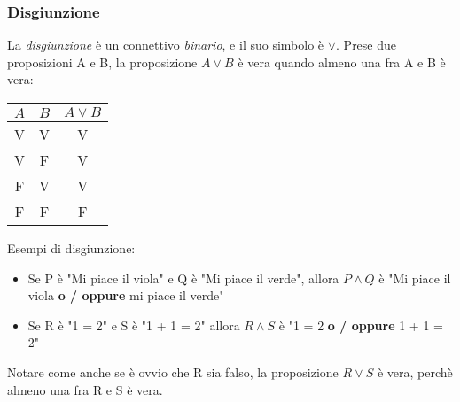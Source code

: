 \documentclass{article}
\begin{document}
\subsubsection{Disgiunzione}
La \textit{disgiunzione} è un connettivo \textit{binario}, e il suo simbolo è $\lor$. 
Prese due proposizioni A e B, la proposizione $A \lor B$ è vera quando almeno
una fra A e B è vera:
\vspace{0.3cm}
\begin{center}
  \begin{tabular}{|c|c|c|}
    \hline
    $A$ & $B$ & $A \lor B$ \\
    \hline
    V & V & V \\
    \hline
    V & F & V \\
    \hline
    F & V & V \\
    \hline
    F & F & F \\
    \hline
  \end{tabular}
\end{center}
\vspace{0.2cm}
Esempi di disgiunzione: 
\begin{itemize}[itemsep=0.05mm]
  \item Se P è "Mi piace il viola" e Q è "Mi piace il verde", allora $P \land Q$ è "Mi piace il viola \textbf{o / oppure} mi piace il verde"
  \item Se R è "1 = 2" e S è "1 + 1 = 2" allora $R \land S$ è "1 = 2 \textbf{o / oppure} 1 + 1 = 2"
\end{itemize}
Notare come anche se è ovvio che R sia falso, la proposizione $R \lor S$ è vera, perchè
almeno una fra R e S è vera. 
\end{document}
